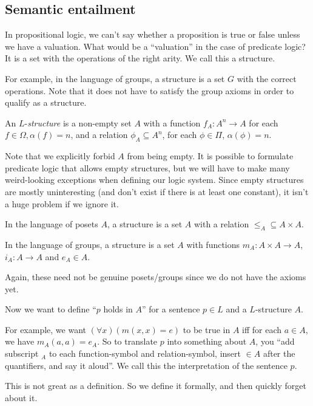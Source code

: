 \documentclass[a4paper]{article}
\begin{document}
\subsection{Semantic entailment}
In propositional logic, we can't say whether a proposition is true or false unless we have a valuation. What would be a ``valuation'' in the case of predicate logic? It is a set with the operations of the right arity. We call this a structure.

For example, in the language of groups, a structure is a set $G$ with the correct operations. Note that it does not have to satisfy the group axioms in order to qualify as a structure.

\begin{defi}[Structure]
  An $L$-\emph{structure} is a non-empty set $A$ with a function $f_A: A^n \to A$ for each $f\in \Omega, \alpha(f) = n$, and a relation $\phi_A\subseteq A^n$, for each $\phi\in \Pi$, $\alpha(\phi) = n$.
\end{defi}
Note that we explicitly forbid $A$ from being empty. It is possible to formulate predicate logic that allows empty structures, but we will have to make many weird-looking exceptions when defining our logic system. Since empty structures are mostly uninteresting (and don't exist if there is at least one constant), it isn't a huge problem if we ignore it.

\begin{eg}
  In the language of posets $A$, a structure is a set $A$ with a relation $\leq_A \subseteq A\times A$.

  In the language of groups, a structure is a set $A$ with functions $m_A: A\times A\to A$, $i_A: A\to A$ and $e_A\in A$.
\end{eg}
Again, these need not be genuine posets/groups since we do not have the axioms yet.

Now we want to define ``$p$ holds in $A$'' for a sentence $p\in L$ and a $L$-structure $A$.

For example, we want $(\forall x)(m(x, x) = e)$ to be true in $A$ iff for each $a\in A$, we have $m_A(a, a) = e_A$. So to translate $p$ into something about $A$, you ``add subscript $_A$ to each function-symbol and relation-symbol, insert $\in A$ after the quantifiers, and say it aloud''. We call this the interpretation of the sentence $p$.

This is not great as a definition. So we define it formally, and then quickly forget about it.
\end{document}
